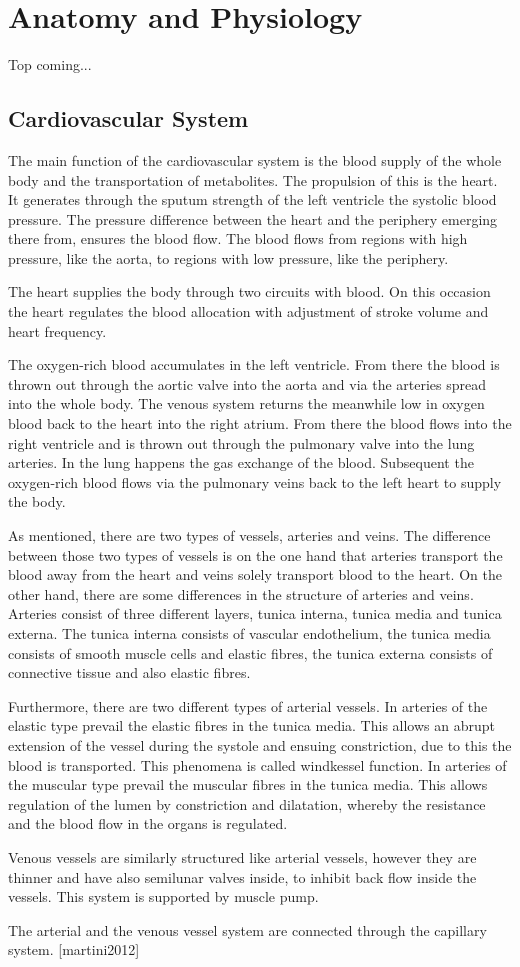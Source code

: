 \chapter{Anatomy and Physiology}
Top coming...

\section{Cardiovascular System}
The main function of the cardiovascular system is the blood supply of the whole body and the transportation of metabolites. The propulsion of this is the heart. It generates through the sputum strength of the left ventricle the systolic blood pressure. The pressure difference between the heart and the periphery emerging there from, ensures the blood flow. The blood flows from regions with high pressure, like the aorta, to regions with low pressure, like the periphery.

The heart supplies the body through two circuits with blood. On this occasion the heart regulates the blood allocation with adjustment of stroke volume and heart frequency.

The oxygen-rich blood accumulates in the left ventricle. From there the blood is thrown out through the aortic valve into the aorta and via the arteries spread into the whole body. The venous system returns the meanwhile low in oxygen blood back to the heart into the right atrium. From there the blood flows into the right ventricle and is thrown out through the pulmonary valve into the lung arteries. In the lung happens the gas exchange of the blood. Subsequent the oxygen-rich blood flows via the pulmonary veins back to the left heart to supply the body.

As mentioned, there are two types of vessels, arteries and veins. The difference between those two types of vessels is on the one hand that arteries transport the blood away from the heart and veins solely transport blood to the heart. On the other hand, there are some differences in the structure of arteries and veins.
Arteries consist of three different layers, tunica interna, tunica media and tunica externa. The tunica interna consists of vascular endothelium,  the tunica media consists of smooth muscle cells and elastic fibres, the tunica externa consists of connective tissue and also elastic fibres.

Furthermore, there are two different types of arterial vessels. In arteries of the elastic type prevail the elastic fibres in the tunica media. This allows an abrupt extension of the vessel during the systole and ensuing constriction, due to this the blood is transported. This phenomena is called windkessel function. In arteries of the muscular type prevail the muscular fibres in the tunica media. This allows regulation of the lumen by constriction and dilatation, whereby the resistance and the blood flow in the organs is regulated.

Venous vessels are similarly structured like arterial vessels, however they are thinner and have also semilunar valves inside, to inhibit back flow inside the vessels. This system is supported by muscle pump.

The arterial and the venous vessel system are connected through the capillary system. [martini2012]
